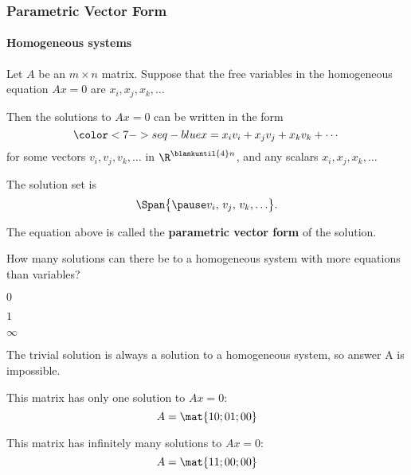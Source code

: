 
\begin{frame}
\frametitle{Parametric Vector Form}
\framesubtitle{Homogeneous systems}

Let $A$ be an $m\times n$ matrix.
\pause
Suppose that the free variables in the
homogeneous equation $Ax=0$ are $x_i,x_j,x_k,\ldots$

\pause\bigskip
Then the solutions to $Ax=0$ can be written in the form
\[ \color<7->{seq-blue} x = x_iv_i + x_jv_j + x_kv_k + \cdots \]
for some vectors $v_i,v_j,v_k,\ldots$ in $\R^{\blankuntil{4}n}$, \pause[4]
and any scalars $x_i,x_j,x_k,\ldots$

\pause\bigskip
The solution set is
\[ \Span\bigl\{ \pause v_i,\,v_j,\,v_k,\ldots\bigr\}. \]

\pause\bigskip
The \textcolor{seq-blue}{equation} above is called the
\textbf{parametric vector form} of the solution.

\end{frame}



\begin{pollframe}

\begin{poll}
\vskip-7mm\null
\begin{bluebox}[Poll]{.7\textwidth}
  How many solutions can there be to a homogeneous system with more equations
  than variables?
  \smallskip
  \begin{eAlpherate}
  \item $0$
  \item $1$
  \item $\infty$
  \end{eAlpherate}
\end{bluebox}

\pause
The trivial solution is always a solution to a homogeneous system, so answer A is
impossible.

\pause\medskip
This matrix has only one solution to $Ax=0$:
\[ A = \mat{1 0; 0 1; 0 0} \]

\pause\medskip
This matrix has infinitely many solutions to $Ax=0$:
\[ A = \mat{1 1; 0 0; 0 0} \]
\end{poll}

\end{pollframe}




